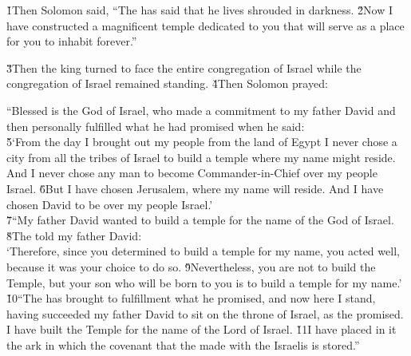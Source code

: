 \v{1}Then Solomon said, ``The  has said that he lives shrouded in darkness. \v{2}Now I have constructed a magnificent temple dedicated to you that will serve as a place for you to inhabit forever.''

\v{3}Then the king turned to face the entire congregation of Israel while the congregation of Israel remained standing. \v{4}Then Solomon prayed:

\begin{poetry}
\poeml ``Blessed is the  God of Israel, who made a commitment to my father David and then personally fulfilled what he had promised when he said: \\
\poeml \v{5}`From the day I brought out my people from the land of Egypt I never chose a city from all the tribes of Israel to build a temple where my name might reside. And I never chose any man to become Commander-in-Chief over my people Israel. \v{6}But I have chosen Jerusalem, where my name will reside. And I have chosen David to be over my people Israel.' \\
\poeml \v{7}``My father David wanted to build a temple for the name of the  God of Israel. \v{8}The  told my father David: \\
\poeml `Therefore, since you determined to build a temple for my name, you acted well, because it was your choice to do so. \v{9}Nevertheless, you are not to build the Temple, but your son who will be born to you is to build a temple for my name.' \\
\poeml \v{10}``The  has brought to fulfillment what he promised, and now here I stand, having succeeded my father David to sit on the throne of Israel, as the  promised. I have built the Temple for the name of the Lord  of Israel. \v{11}I have placed in it the ark in which the covenant that the  made with the Israelis is stored.''
\end{poetry}

